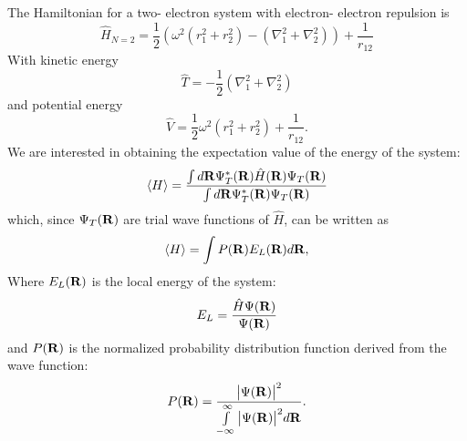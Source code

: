 \documentclass[10pt,a4paper]{article}
\begin{document}
The Hamiltonian for a two- electron system with electron- electron repulsion is
\begin{equation}
\hat{H}_{N=2} = \frac{1}{2}\left( \omega^2   \left( r_1^2+r_2^2 \right)-\left( \nabla_1^2 + \nabla_2^2 \right)  \right)+\frac{1}{r_{12}}
\end{equation}
With kinetic energy 
\begin{equation}
\hat{T} = - \frac{1}{2}\left( \nabla_1^2 + \nabla_2^2 \right) 
\end{equation}
and potential energy 
\begin{equation}
\hat{V}=  \frac{1}{2} \omega^2   \left( r_1^2+r_2^2 \right) +\frac{1}{r_{12}}.
\end{equation}
We are interested in obtaining the expectation value of the energy of the system:
\begin{equation}
\langle H \rangle = \frac{\int d{\bf
R}\Psi^{\ast}_T({\bf R})\hat{H}({\bf R})\Psi_T({\bf R})}
{\int d{\bf
R}\Psi^{\ast}_T({\bf R})\Psi_T({\bf R})}
\end{equation}
which, since $\Psi_T({\bf R})$ are trial wave functions of $\hat{H}$, can be written as 
\begin{equation}\label{Energy_expectation_value}
\langle H \rangle =\int P({\bf R})E_L({\bf R})d{\bf R},
\end{equation}
Where $E_L({\bf R})$ is the local energy of the system:
\begin{equation}
E_L = \frac{\hat{H}\Psi({\bf R})}{\Psi({\bf R})}
\end{equation}
and $P({\bf R})$ is the normalized probability distribution function derived from the wave function:
\begin{equation}
P({\bf R})=\frac{\big| \Psi({\bf R}) \big|^2}{\int\limits_{-\infty}^\infty\big| \Psi({\bf R}) \big|^2 d{\bf R}}.
\end{equation}
\end{document}
